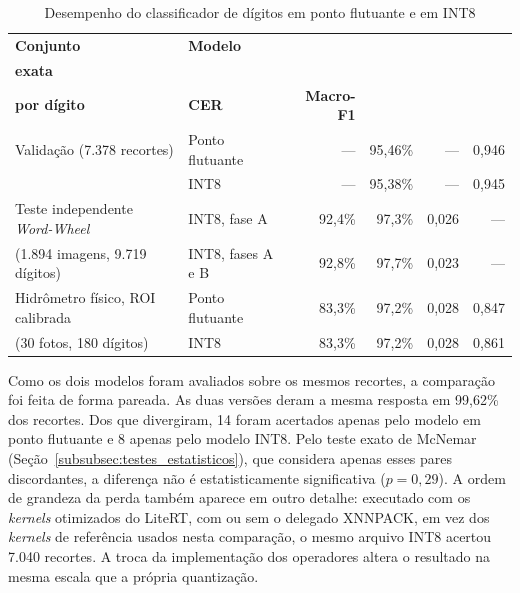 \begin{table}[H]
    \centering
    \caption{Desempenho do classificador de dígitos em ponto flutuante e em INT8}
    \label{tab:resultado_quantizacao}
    \small
    \begin{tabularx}{\textwidth}{@{}>{\raggedright\arraybackslash}Xlrrrr@{}}
        \toprule
        \textbf{Conjunto} & \textbf{Modelo}
        & \begin{tabular}[b]{@{}r@{}}\textbf{Leitura}\\\textbf{exata}\end{tabular}
        & \begin{tabular}[b]{@{}r@{}}\textbf{Acerto}\\\textbf{por dígito}\end{tabular}
        & \textbf{CER} & \textbf{Macro-F1} \\
        \midrule
        Validação (7.378 recortes) & Ponto flutuante & --- & 95,46\% & --- & 0,946 \\
                                   & INT8            & --- & 95,38\% & --- & 0,945 \\
        \addlinespace
        Teste independente \textit{Word-Wheel} & INT8, fase A & 92,4\% & 97,3\% & 0,026 & --- \\
        (1.894 imagens, 9.719 dígitos)          & INT8, fases A e B & 92,8\% & 97,7\% & 0,023 & --- \\
        \addlinespace
        Hidrômetro físico, ROI calibrada & Ponto flutuante & 83,3\% & 97,2\% & 0,028 & 0,847 \\
        (30 fotos, 180 dígitos)          & INT8            & 83,3\% & 97,2\% & 0,028 & 0,861 \\
        \bottomrule
    \end{tabularx}
\end{table}

Como os dois modelos foram avaliados sobre os mesmos recortes, a comparação foi feita de
forma pareada. As duas versões deram a mesma resposta em 99,62\% dos recortes. Dos que
divergiram, 14 foram acertados apenas pelo modelo em ponto flutuante e 8 apenas pelo modelo
INT8. Pelo teste exato de McNemar (Seção~\ref{subsubsec:testes_estatisticos}), que considera apenas esses pares discordantes, a
diferença não é estatisticamente significativa ($p = 0{,}29$). A ordem de grandeza da perda
também aparece em outro detalhe: executado com os \textit{kernels} otimizados do LiteRT,
com ou sem o delegado XNNPACK, em vez dos \textit{kernels} de referência usados nesta
comparação, o mesmo arquivo INT8 acertou 7.040 recortes. A troca da implementação dos
operadores altera o resultado na mesma escala que a própria quantização.

